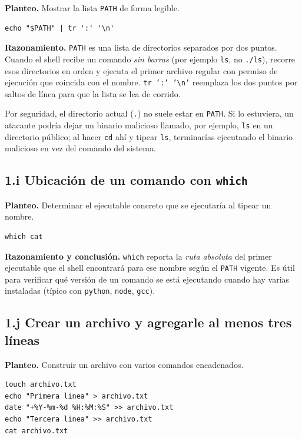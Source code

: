 \documentclass[11pt,a4paper]{article}
\begin{document}
\textbf{Planteo.} Mostrar la lista \texttt{PATH} de forma legible.

\begin{lstlisting}
echo "$PATH" | tr ':' '\n'
\end{lstlisting}

\textbf{Razonamiento.} \texttt{PATH} es una lista de directorios
separados por dos puntos. Cuando el shell recibe un comando \emph{sin
barras} (por ejemplo \texttt{ls}, no \texttt{./ls}), recorre esos
directorios en orden y ejecuta el primer archivo regular con permiso
de ejecución que coincida con el nombre. \texttt{tr ':' '\textbackslash n'}
reemplaza los dos puntos por saltos de línea para que la lista se lea
de corrido.

\begin{ojo}
Por seguridad, el directorio actual (\texttt{.}) no suele estar en
\texttt{PATH}. Si lo estuviera, un atacante podría dejar un binario
malicioso llamado, por ejemplo, \texttt{ls} en un directorio
público; al hacer \texttt{cd} ahí y tipear \texttt{ls}, terminarías
ejecutando el binario malicioso en vez del comando del sistema.
\end{ojo}

\subsection*{1.i Ubicación de un comando con \texttt{which}}

\textbf{Planteo.} Determinar el ejecutable concreto que se ejecutaría
al tipear un nombre.

\begin{lstlisting}
which cat
\end{lstlisting}

\textbf{Razonamiento y conclusión.} \texttt{which} reporta la
\emph{ruta absoluta} del primer ejecutable que el shell encontrará
para ese nombre según el \texttt{PATH} vigente. Es útil para verificar
qué versión de un comando se está ejecutando cuando hay varias
instaladas (típico con \texttt{python}, \texttt{node}, \texttt{gcc}).

\subsection*{1.j Crear un archivo y agregarle al menos tres líneas}

\textbf{Planteo.} Construir un archivo con varios comandos
encadenados.

\begin{lstlisting}
touch archivo.txt
echo "Primera linea" > archivo.txt
date "+%Y-%m-%d %H:%M:%S" >> archivo.txt
echo "Tercera linea" >> archivo.txt
cat archivo.txt
\end{lstlisting}
\end{document}
